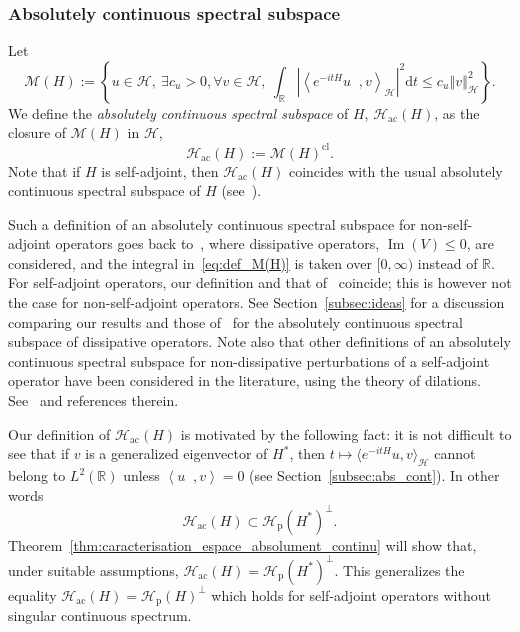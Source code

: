 \documentclass[AHL,Unicode,longabstracts,published]{cedram}
\newcommand{\Hi}{\mathcal{H}}
\newcommand{\R}{\mathbb{R}}
\newcommand{\rmp}{\mathrm{p}}
\newcommand{\acr}{\mathrm{ac}}
\newcommand{\rmd}{\mathrm{d}}
\newcommand{\norme}[1]{\left\Vert #1\right\Vert}
\newcommand{\scal}[2]{\left\langle{#1} \middle., {#2}\right\rangle}
\newcommand{\abso}[1]{\left|{#1}\right|}
\DeclareMathOperator{\im}{Im}
\let\oldexists\exists
\renewcommand*{\exists}{\mathrel{\oldexists}}
\let\oldforall\forall
\renewcommand*{\forall}{\mathrel{\oldforall}}
\newcommand{\Hi}{\mathcal{H}}
\newcommand{\rmp}{\mathrm{p}}
\newcommand{\R}{\mathbb{R}}
\DeclareMathOperator{\im}{Im}
\newcommand{\acr}{\mathrm{ac}}
\begin{document}
\subsubsection{Absolutely continuous spectral subspace}\label{subsub:defi_absolutely_continuous_spectral_subspace}

Let
\begin{equation}\label{eq:def_M(H)}
\mathcal{M}(H):=\left\lbrace u\in\Hi,~\exists c_u>0,\forall v\in\Hi,~\int_\R\abso{\scal{e^{-itH}u}{v}_\Hi}^2\rmd t\leq c_u\norme{v}^2_\Hi \right\rbrace.
\end{equation}
We define the \emph{absolutely continuous spectral subspace} of $H$, $\Hi_\acr(H)$, as the closure of $\mathcal{M}(H)$ in $\Hi$,
\begin{equation}\label{eq:def_Hac}
\Hi_\acr(H) := \mathcal{M}(H)^{\mathrm{cl}}.
\end{equation}
Note that if $H$ is self-adjoint, then $\Hi_{\acr}(H)$ coincides with the usual absolutely continuous spectral subspace of $H$ (see~\cite[Theorem~6.24]{Da80}).

Such a definition of an absolutely continuous spectral subspace for non-self-adjoint operators goes back to~\cite{Da78_01}, where dissipative operators, $\im(V)\le0$, are considered, and the integral in~\eqref{eq:def_M(H)} is taken over $[0,\infty)$ instead of $\R$. For self-adjoint operators, our definition and that of~\cite{Da78_01} coincide; this is however not the case for non-self-adjoint operators. See Section~\ref{subsec:ideas} for a discussion comparing our results and those of~\cite{Da78_01,Da80_01} for the absolutely continuous spectral subspace of dissipative operators. Note also that other definitions of an absolutely continuous spectral subspace for non-dissipative perturbations of a self-adjoint operator have been considered in the literature, using the theory of dilations. See~\cite{KiNa09_01,Na76_01} and references therein.

Our definition of $\Hi_\acr(H)$ is motivated by the following fact: it is not difficult to see that if $v$ is a generalized eigenvector of $H^*$, then $t\mapsto \langle e^{-itH}u, v \rangle_\Hi$ cannot belong to $L^2(\R)$ unless $\scal{u}{v}=0$ (see Section~\ref{subsec:abs_cont}). In other words
\begin{equation*}
\Hi_{\acr}(H)\subset\Hi_{\rmp}(H^*)^\perp.
\end{equation*}
Theorem~\ref{thm:caracterisation_espace_absolument_continu} will show that, under suitable assumptions, $
\Hi_\acr(H) = \Hi_{\rmp}(H^*)^\perp$.  This generalizes the equality $
\Hi_\acr(H) = \Hi_{\rmp}(H)^\perp$ which holds for self-adjoint operators without singular continuous spectrum.
\end{document}
